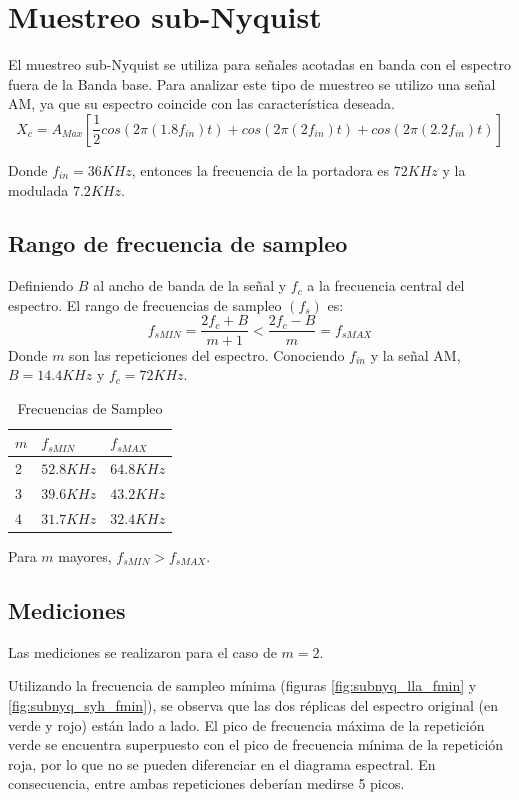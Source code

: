 \documentclass[../../ASSD_TP1_G7.tex]{subfiles}
\begin{document}
\chapter*{Muestreo sub-Nyquist}
El muestreo sub-Nyquist se utiliza para se\~nales acotadas en banda con el espectro fuera de la Banda base. Para analizar este tipo de muestreo se utilizo una se\~nal AM, ya que su espectro coincide con las característica deseada.
\begin{equation}
X_c=A_{Max}[\frac{1}{2}cos(2\pi (1.8 f_{in})t)+cos(2\pi (2 f_{in})t)+cos(2\pi (2.2 f_{in})t)]
\end{equation}\label{eq:inputSignlan}

Donde $f_{in}= 36KHz$, entonces la frecuencia de la portadora es $72KHz$ y la modulada $7.2KHz$.
\section*{Rango de frecuencia de sampleo}
Definiendo $B$ al ancho de banda de la se\~nal y $f_c$ a la frecuencia central del espectro. El rango de frecuencias de sampleo $(f_s)$ es:
\begin{equation}
f_{sMIN}=\frac{2f_c + B}{m+1} < \frac{2f_c - B}{m} = f_{sMAX}
\end{equation}
Donde $m$ son las repeticiones del espectro. Conociendo $f_{in}$ y la se\~nal AM, $B=14.4KHz$ y $f_c=72KHz$.

\begin{table}[htbp]
\begin{center}
\begin{tabular}{|l|l|l|}
\hline
$m$ & $f_{sMIN}$ & $f_{sMAX}$  \\
\hline \hline
2 & $52.8KHz$ & $64.8KHz$ \\ \hline
3 & $39.6KHz$ & $43.2KHz$ \\ \hline
4 & $31.7KHz$ & $32.4KHz$ \\ \hline
\end{tabular}
\caption{Frecuencias de Sampleo}
\label{tabla:fsamp}
\end{center}
\end{table}
Para $m$ mayores, $f_{sMIN}>f_{sMAX}$.

\section*{Mediciones}
Las mediciones se realizaron para el caso de $m=2$.

Utilizando la frecuencia de sampleo m\'inima (figuras \ref{fig:subnyq_lla_fmin} y \ref{fig:subnyq_syh_fmin}), se observa que las dos r\'eplicas del espectro original (en verde y rojo) est\'an lado a lado. El pico de frecuencia m\'axima de la repetici\'on verde se encuentra superpuesto con el pico de frecuencia m\'inima de la repetici\'on roja, por lo que no se pueden diferenciar en el diagrama espectral. En consecuencia, entre ambas repeticiones deber\'ian medirse 5 picos. 
\end{document}
